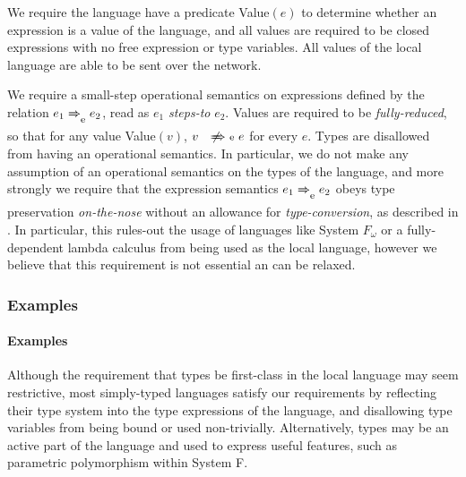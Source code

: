 We require the language have a predicate Value$(e)$ to determine whether an expression is a value of the language, and all values are required to be closed expressions with no free expression or type variables.
All values of the local language are able to be sent over the network.

We require a small-step operational semantics on expressions defined by the relation $e_1 \localstep{} e_2$, read as $e_1$ \emph{steps-to} $e_2$.
Values are required to be \emph{fully-reduced}, so that for any value Value$(v)$, $v \nlocalstep{} e$ for every $e$.
Types are disallowed from having an operational semantics.
In particular, we do not make any assumption of an operational semantics on the types of the language, and more strongly we require that the expression semantics $e_1 \localstep{} e_2$ obeys type preservation \emph{on-the-nose} without an allowance for \emph{type-conversion}, as described in \todo.
In particular, this rules-out the usage of languages like System $F_\omega$ or a fully-dependent lambda calculus from being used as the local language, however we believe that this requirement is not essential an can be relaxed.

\iftr\subsubsection{Examples}\else\paragraph{Examples}\fi
\label{sec:loc-lang-examples}

Although the requirement that types be first-class in the local language may seem restrictive, most simply-typed languages satisfy our requirements by reflecting their type system into the type expressions of the language, and disallowing type variables from being bound or used non-trivially.
Alternatively, types may be an active part of the language and used to express useful features, such as parametric polymorphism within System F.


